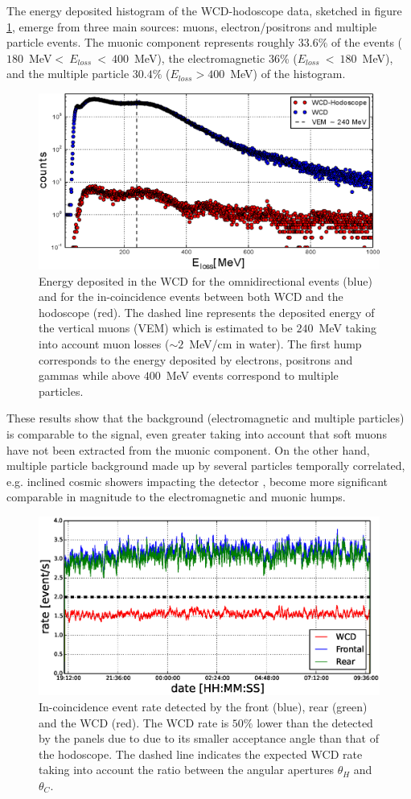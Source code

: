 \documentclass[letterpaper,11pt]{article}
\begin{document}
The energy deposited histogram of the WCD-hodoscope data, sketched in figure \ref{fig:WCDHod_rate}, emerge from three main sources: muons, electron/positrons and multiple particle events. The muonic component represents roughly $33.6\%$ of the events ($180$~MeV$<~E_{loss}~<~400$~MeV), the electromagnetic $36$\% ($E_{loss}~<~180$~MeV), and the multiple particle $30.4\%$ ($E_{loss} > 400$~MeV) of the histogram. 

\begin{figure}
\centering
\includegraphics[width=0.7\columnwidth]{Figures/WCDHod.eps}
\caption{Energy deposited in the WCD for the omnidirectional events (blue) and for the in-coincidence events between both WCD and the hodoscope (red). The dashed line represents the deposited energy of the vertical muons (VEM) which is estimated to be $240$~MeV taking into account muon losses ($\sim 2$~MeV/cm in water). The first hump corresponds to the energy deposited by electrons, positrons and gammas while above $400$~MeV events correspond to multiple particles.}
\label{fig:WCDHod_rate}
\end{figure}

These results show that the background (electromagnetic and multiple particles) is comparable to the signal, even greater taking into account that soft muons have not been extracted from the muonic component. On the other hand, multiple particle background made up by several particles temporally correlated, e.g. inclined cosmic showers impacting the detector \cite{Bonechi2019}, become more significant comparable in magnitude to the electromagnetic and muonic humps.

\begin{figure}[htb]
\centering
\includegraphics[width=0.8\columnwidth]{Figures/HodWCDRate.eps}
\caption{In-coincidence event rate detected by the front (blue), rear (green) and the WCD (red). The WCD rate is $50\%$ lower than the detected by the panels due to due to its smaller acceptance angle than that of the hodoscope. The dashed line indicates the expected WCD rate taking into account the ratio between the angular apertures $\theta_H$ and $\theta_C$.}
\label{fig:RateWCDH}
\end{figure}
\end{document}
